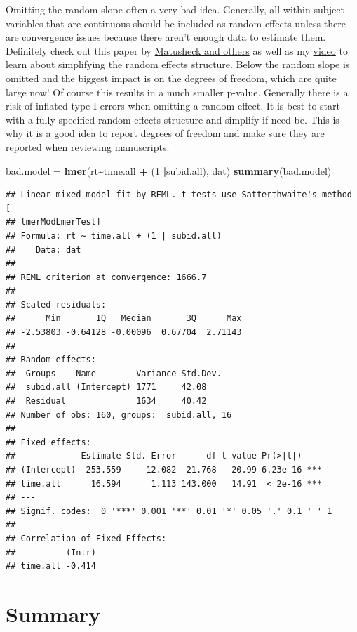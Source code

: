 \documentclass[
]{book}
\newenvironment{Shaded}{\begin{snugshade}}{\end{snugshade}}
\newcommand{\DecValTok}[1]{\textcolor[rgb]{0.00,0.00,0.81}{#1}}
\newcommand{\KeywordTok}[1]{\textcolor[rgb]{0.13,0.29,0.53}{\textbf{#1}}}
\newcommand{\NormalTok}[1]{#1}
\newcommand{\OperatorTok}[1]{\textcolor[rgb]{0.81,0.36,0.00}{\textbf{#1}}}
\newcommand{\StringTok}[1]{\textcolor[rgb]{0.31,0.60,0.02}{#1}}
\begin{document}
Omitting the random slope often a very bad idea. Generally, all within-subject variables that are continuous should be included as random effects unless there are convergence issues because there aren't enough data to estimate them. Definitely check out this paper by \href{https://www.sciencedirect.com/science/article/pii/S0749596X17300013}{Matusheck and others} as well as my \href{https://www.youtube.com/watch?v=pDNEgcl0YhI}{video} to learn about simplifying the random effects structure.
Below the random slope is omitted and the biggest impact is on the degrees of freedom, which are quite large now! Of course this results in a much smaller p-value. Generally there is a risk of inflated type I errors when omitting a random effect. It is best to start with a fully specified random effects structure and simplify if need be. This is why it is a good idea to report degrees of freedom and make sure they are reported when reviewing manuscripts.

\begin{Shaded}
\begin{Highlighting}[]
\NormalTok{bad.model =}\StringTok{ }\KeywordTok{lmer}\NormalTok{(rt}\OperatorTok{\textasciitilde{}}\NormalTok{time.all }\OperatorTok{+}\StringTok{ }\NormalTok{(}\DecValTok{1} \OperatorTok{|}\NormalTok{subid.all), dat)}
\KeywordTok{summary}\NormalTok{(bad.model)  }
\end{Highlighting}
\end{Shaded}

\begin{verbatim}
## Linear mixed model fit by REML. t-tests use Satterthwaite's method [
## lmerModLmerTest]
## Formula: rt ~ time.all + (1 | subid.all)
##    Data: dat
## 
## REML criterion at convergence: 1666.7
## 
## Scaled residuals: 
##      Min       1Q   Median       3Q      Max 
## -2.53803 -0.64128 -0.00096  0.67704  2.71143 
## 
## Random effects:
##  Groups    Name        Variance Std.Dev.
##  subid.all (Intercept) 1771     42.08   
##  Residual              1634     40.42   
## Number of obs: 160, groups:  subid.all, 16
## 
## Fixed effects:
##             Estimate Std. Error      df t value Pr(>|t|)    
## (Intercept)  253.559     12.082  21.768   20.99 6.23e-16 ***
## time.all      16.594      1.113 143.000   14.91  < 2e-16 ***
## ---
## Signif. codes:  0 '***' 0.001 '**' 0.01 '*' 0.05 '.' 0.1 ' ' 1
## 
## Correlation of Fixed Effects:
##          (Intr)
## time.all -0.414
\end{verbatim}

\hypertarget{summary}{%
\section*{Summary}\label{summary}}
\end{document}
